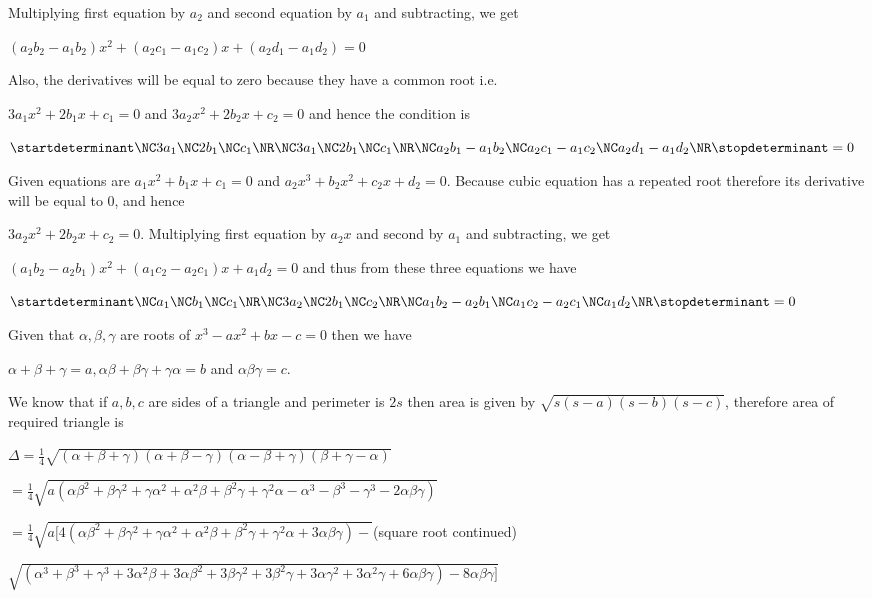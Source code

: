  Multiplying first equation by $a_2$ and second equation by $a_1$ and subtracting, we get

  $(a_2b_2 - a_1b_2)x^2 + (a_2c_1 - a_1c_2)x + (a_2d_1 - a_1d_2) = 0$

  Also, the derivatives will be equal to zero because they have a common root i.e.

  $3a_1x^2 + 2b_1x + c_1 = 0$ and $3a_2x^2 + 2b_2x + c_2 = 0$ and hence the condition is

  $\startdeterminant\NC 3a_1\NC 2b_1\NC c_1\NR\NC 3a_1\NC 2b_1\NC c_1\NR\NC a_2b_1 - a_1b_2\NC a_2c_1 -
  a_1c_2\NC a_2d_1 - a_1d_2\NR\stopdeterminant = 0$
\item Given equations are $a_1x^2 + b_1x + c_1 = 0$ and $a_2x^3 + b_2x^2 + c_2x + d_2 = 0$. Because cubic
  equation has a repeated root therefore its derivative will be equal to $0$, and hence

  $3a_2x^2 + 2b_2x + c_2 = 0$. Multiplying first equation by $a_2x$ and second by $a_1$ and subtracting, we
  get

  $(a_1b_2 - a_2b_1)x^2 + (a_1c_2 - a_2c_1)x + a_1d_2 = 0$ and thus from these three equations we have

  $\startdeterminant\NC a_1 \NC b_1\NC c_1\NR\NC 3a_2 \NC 2b_1\NC c_2\NR\NC a_1b_2 - a_2b_1\NC a_1c_2 -
  a_2c_1\NC a_1d_2\NR\stopdeterminant = 0$
\item Given that $\alpha, \beta, \gamma$ are roots of $x^3 - ax^2 + bx - c = 0$ then we have

  $\alpha + \beta + \gamma = a, \alpha\beta + \beta\gamma + \gamma\alpha = b$ and $\alpha\beta\gamma = c$.

  We know that if $a, b, c$ are sides of a triangle and perimeter is $2s$ then area is given by $\sqrt{s(s -
    a)(s - b)(s - c)}$, therefore area of required triangle is

  $\Delta = \frac{1}{4}\sqrt{(\alpha + \beta + \gamma)(\alpha + \beta - \gamma)(\alpha - \beta + \gamma)(\beta +
    \gamma - \alpha )}$

  $= \frac{1}{4}\sqrt{a(\alpha\beta^2 + \beta\gamma^2 + \gamma\alpha^2 + \alpha^2\beta + \beta^2\gamma +
    \gamma^2\alpha - \alpha^3 - \beta^3 - \gamma^3 - 2\alpha\beta\gamma)}$

  $= \frac{1}{4}\sqrt{a[4(\alpha\beta^2 + \beta\gamma^2 + \gamma\alpha^2 + \alpha^2\beta + \beta^2\gamma +
      \gamma^2\alpha + 3\alpha\beta\gamma) - }$(square root continued)

    $\sqrt{(\alpha^3 + \beta^3 + \gamma^3 + 3\alpha^2\beta + 3\alpha\beta^2
    + 3\beta\gamma^2 + 3\beta^2\gamma + 3\alpha\gamma^2 + 3\alpha^2\gamma + 6\alpha\beta\gamma) -
    8\alpha\beta\gamma]}$

